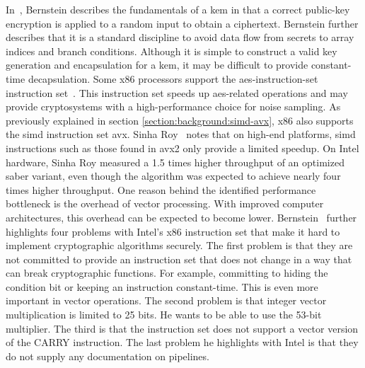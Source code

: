 In~\cite{bernstein2018}, Bernstein describes the fundamentals of a \gls{kem} in that a correct public-key encryption is applied to a random input to obtain a ciphertext. Bernstein further describes that it is a standard discipline to avoid data flow from secrets to array indices and branch conditions. Although it is simple to construct a valid key generation and encapsulation for a \gls{kem}, it may be difficult to provide constant-time decapsulation.
Some \gls{x86} processors support the \gls{aes-instruction-set} instruction set~\cite{alkim2016}. This instruction set speeds up \gls{aes}-related operations and may provide cryptosystems with a high-performance choice for noise sampling. As previously explained in section \ref{section:background:simd-avx}, \gls{x86} also supports the \gls{simd} instruction set \gls{avx}. Sinha Roy~\cite{sinha2019} notes that on high-end platforms, \gls{simd} instructions such as those found in \gls{avx2} only provide a limited speedup. On Intel hardware, Sinha Roy measured a 1.5 times higher throughput of an optimized \gls{saber} variant, even though the algorithm was expected to achieve nearly four times higher throughput. One reason behind the identified performance bottleneck is the overhead of vector processing. With improved computer architectures, this overhead can be expected to become lower. Bernstein~\cite{bernstein2014} further highlights four problems with Intel's \gls{x86} instruction set that make it hard to implement cryptographic algorithms securely. The first problem is that they are not committed to provide an instruction set that does not change in a way that can break cryptographic functions. For example, committing to hiding the condition bit or keeping an instruction constant-time. This is even more important in vector operations. The second problem is that integer vector multiplication is limited to 25 bits. He wants to be able to use the 53-bit multiplier. The third is that the instruction set does not support a vector version of the CARRY instruction. The last problem he highlights with Intel is that they do not supply any documentation on pipelines.


